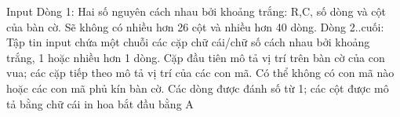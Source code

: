 Input
Dòng 1: Hai số nguyên cách nhau bởi khoảng trắng: R,C, số dòng và cột của bàn cờ. Sẽ không có nhiều hơn 26 cột và nhiều hơn 40 dòng. Dòng 2..cuối: Tập tin input chứa một chuỗi các cặp chữ cái/chữ số cách nhau bởi khoảng trắng, 1 hoặc nhiều hơn 1 dòng. Cặp đầu tiên mô tả vị trí trên bàn cờ của con vua; các cặp tiếp theo mô tả vị trí của các con mã. Có thể không có con mã nào hoặc các con mã phủ kín bàn cờ. Các dòng được đánh số từ 1; các cột được mô tả bằng chữ cái in hoa bắt đầu bằng A